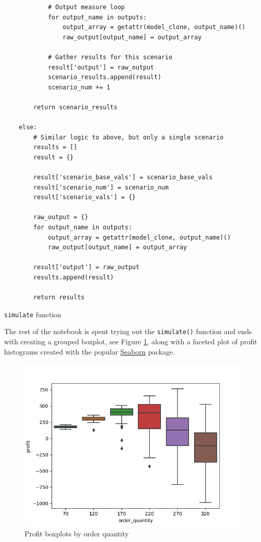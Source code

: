 \documentclass[ited]{informs3}                      %
\newcommand{\code}[1]{\texttt{#1}}
\begin{document}
\begin{listing}
\begin{verbatim}
            # Output measure loop
            for output_name in outputs:
                output_array = getattr(model_clone, output_name)()
                raw_output[output_name] = output_array
            
            # Gather results for this scenario
            result['output'] = raw_output
            scenario_results.append(result)
            scenario_num += 1
                
        return scenario_results

    else:
        # Similar logic to above, but only a single scenario
        results = []
        result = {}

        result['scenario_base_vals'] = scenario_base_vals
        result['scenario_num'] = scenario_num
        result['scenario_vals'] = {}
        
        raw_output = {}
        for output_name in outputs:
            output_array = getattr(model_clone, output_name)()
            raw_output[output_name] = output_array
            
        result['output'] = raw_output  
        results.append(result)

        return results
\end{verbatim}
\caption{\code{simulate} function}
\label{fig:simulate_function}
\end{listing}

The rest of the notebook is spent trying out the \code{simulate()} function and ends with creating a grouped boxplot, see Figure \ref{fig:boxplot}, along with a faceted plot of profit histograms created with the popular \href{https://seaborn.pydata.org/}{Seaborn} package.

\begin{figure}[!htbp]
\centering
\includegraphics[width=1.0\textwidth]{images/boxplots}
\caption{Profit boxplots by order quantity}
\label{fig:boxplot}
\end{figure}
\end{document}
